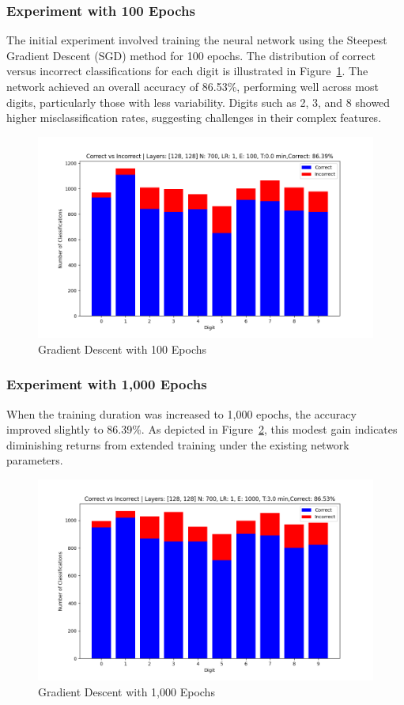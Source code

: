 \documentclass{article}
\begin{document}
\subsubsection{Experiment with 100 Epochs}
The initial experiment involved training the neural network using the Steepest Gradient Descent (SGD) method for 100 epochs. The distribution of correct versus incorrect classifications for each digit is illustrated in Figure~\ref{fig:gd_100ep}. The network achieved an overall accuracy of 86.53\%, performing well across most digits, particularly those with less variability. Digits such as 2, 3, and 8 showed higher misclassification rates, suggesting challenges in their complex features.

\begin{figure}[h!]
    \centering
    \includegraphics[scale=0.5]{../figs/gd_100ep.png}
    \caption{Gradient Descent with 100 Epochs}
    \label{fig:gd_100ep}
\end{figure}

\subsubsection{Experiment with 1,000 Epochs}
When the training duration was increased to 1,000 epochs, the accuracy improved slightly to 86.39\%. As depicted in Figure~\ref{fig:gd_1000ep}, this modest gain indicates diminishing returns from extended training under the existing network parameters.

\begin{figure}[h!]
    \centering
    \includegraphics[scale=0.5]{../figs/gd_1000ep.png}
    \caption{Gradient Descent with 1,000 Epochs}
    \label{fig:gd_1000ep}
\end{figure}
\end{document}
